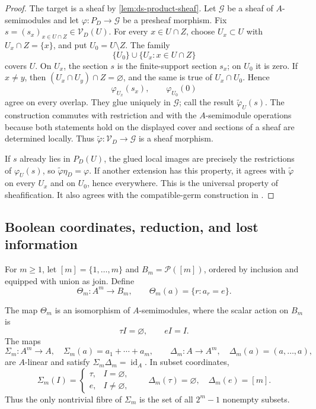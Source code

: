 \begin{proof}
The target is a sheaf by \cref{lem:ds-product-sheaf}.  Let $\mathcal G$ be a
sheaf of $A$-semimodules and let $\varphi:P_D\to\mathcal G$ be a presheaf
morphism.  Fix $s=(s_x)_{x\in U\cap Z}\in\mathcal V_D(U)$.  For every
$x\in U\cap Z$, choose $U_x\subset U$ with $U_x\cap Z=\{x\}$, and put
$U_0=U\setminus Z$.  The family
\[
 \{U_0\}\cup\{U_x:x\in U\cap Z\}
\]
covers $U$.  On $U_x$, the section $s$ is the finite-support section $s_x$;
on $U_0$ it is zero.  If $x\ne y$, then
$(U_x\cap U_y)\cap Z=\varnothing$, and the same is true of
$U_x\cap U_0$.  Hence
\[
 \varphi_{U_x}(s_x),\qquad \varphi_{U_0}(0)
\]
agree on every overlap.  They glue uniquely in $\mathcal G$; call the result
$\widetilde\varphi_U(s)$.  The construction commutes with restriction and with
the $A$-semimodule operations because both statements hold on the displayed
cover and sections of a sheaf are determined locally.  Thus
$\widetilde\varphi:\mathcal V_D\to\mathcal G$ is a sheaf morphism.

If $s$ already lies in $P_D(U)$, the glued local images are precisely the
restrictions of $\varphi_U(s)$, so
$\widetilde\varphi\eta_D=\varphi$.  If another extension has this property, it
agrees with $\widetilde\varphi$ on every $U_x$ and on $U_0$, hence everywhere.
This is the universal property of sheafification.  It also agrees with the
compatible-germ construction in \cite[\S2.4.4--2.4.7]{vakil2024}.
\end{proof}

\subsection{Boolean coordinates, reduction, and lost information}

For $m\geq1$, let $[m]=\{1,\ldots,m\}$ and $B_m=\mathcal P([m])$, ordered by
inclusion and equipped with union as join.  Define
\[
 \Theta_m:A^m\longrightarrow B_m,
 \qquad
 \Theta_m(a)=\{r:a_r=e\}.
\]

\begin{proposition}
\label{prop:ds-boolean-retract}
The map $\Theta_m$ is an isomorphism of $A$-semimodules, where the scalar action
on $B_m$ is
\[
 \tau I=\varnothing,\qquad eI=I.
\]
The maps
\[
 \Sigma_m:A^m\to A,\quad \Sigma_m(a)=a_1+\cdots+a_m,
 \qquad
 \Delta_m:A\to A^m,\quad \Delta_m(a)=(a,\ldots,a),
\]
are $A$-linear and satisfy $\Sigma_m\Delta_m=\operatorname{id}_A$.  In subset
coordinates,
\[
 \Sigma_m(I)=
 \begin{cases}\tau,&I=\varnothing,\\ e,&I\ne\varnothing,\end{cases}
 \qquad
 \Delta_m(\tau)=\varnothing,\quad \Delta_m(e)=[m].
\]
Thus the only nontrivial fibre of $\Sigma_m$ is the set of all
$2^m-1$ nonempty subsets.
\end{proposition}

